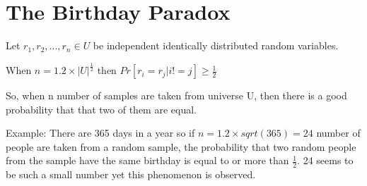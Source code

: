 \documentclass[a4paper, 12pt]{article}
\begin{document}
\section{The Birthday Paradox}

Let $r_1, r_2,...,r_n \in U$ be independent identically distributed random variables.

When $n = 1.2 \times |U|^\frac{1}{2}$ then $Pr[r_i = r_j | i!=j] \geq \frac{1}{2}$

So, when n number of samples are taken from universe U, then there is a good probability that that two of them are equal.

Example: There are 365 days in a year so if $n = 1.2 \times sqrt(365) = 24$ number of people are taken from a random sample, the probability that two random people from the sample have the same birthday is equal to or more than $\frac{1}{2}$. 24 seems to be such a small number yet this phenomenon is observed.
\end{document}
